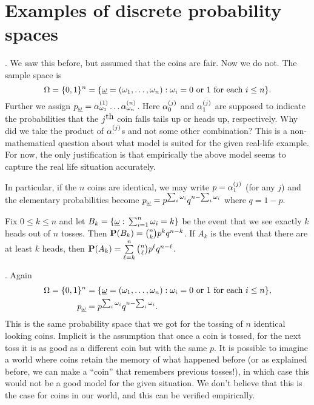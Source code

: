 \documentclass[preprint,  11pt]{amsart}
\def\omeg{\underline{\ome}}
\begin{document}
\section{Examples of discrete probability spaces}
\begin{example} . We saw this before, but assumed that the coins are fair. Now we do not.  The sample space is
$$
\Ome=\{0,1\}^{n}=\{\omeg=(\ome_{1},\ldots ,\ome_{n})\suchthat \ome_{i}=0 \mb{ or } 1 \mb{ for each }i\le n\}.
$$
Further we assign $p_{\omeg}=\alp_{\ome_{1}}^{(1)}\ldots \alp_{\ome_{n}}^{(n)}$. Here $\alp_{0}^{(j)}$ and $\alp_{1}^{(j)}$ are supposed to indicate the probabilities that the $j^{\mb{th}}$ coin falls tails up or heads up, respectively. Why did we take the product of $\alp^{(j)}_{\cdot}$s and not some other combination? This is a non-mathematical question about what model is suited for the given real-life example. For now, the only justification is that empirically the above model seems to capture the real life situation accurately.

In particular, if the $n$ coins are identical, we may write $p=\alp_{1}^{(j)}$ (for any $j$) and the elementary probabilities become  $p_{\omeg}=p^{\sum_{i}\ome_{i}}q^{n-\sum_{i}\ome_{i}}$ where $q=1-p$. 

Fix $0\le k\le n$ and let $B_{k}=\{\omeg\suchthat \sum_{i=1}^{n}\ome_{i}=k\}$ be the event that we see exactly $k$ heads out of $n$ tosses. Then $\P(B_{k})=\binom{n}{k}p^{k}q^{n-k}$. If $A_{k}$ is the event that there are at least $k$ heads, then
$\P(A_{k})=\summ_{\ell=k}^{n}\binom{n}{\ell}p^{\ell}q^{n-\ell}$.
\end{example}

\begin{example} . Again 
\begin{align*}
\Ome=\{0,1\}^{n}&=\{\omeg=(\ome_{1},\ldots ,\ome_{n})\suchthat \ome_{i}=0 \mb{ or } 1 \mb{ for each }i\le n\}, \\
p_{\omeg}&=p^{\sum_{i}\ome_{i}}q^{n-\sum_{i}\ome_{i}}.
\end{align*}
This is the same probability space that we got for the tossing of $n$ identical looking coins. Implicit is the assumption that once a coin is tossed, for the next toss it is as good as a different coin but with the same $p$. It is possible to imagine a world where coins retain the memory of what happened before (or as explained before, we can make a ``coin'' that remembers previous tosses!), in which case this would not be a good model for the given situation. We don't believe that this is the case for coins in our world, and this can be verified empirically.
\end{example}
\end{document}

